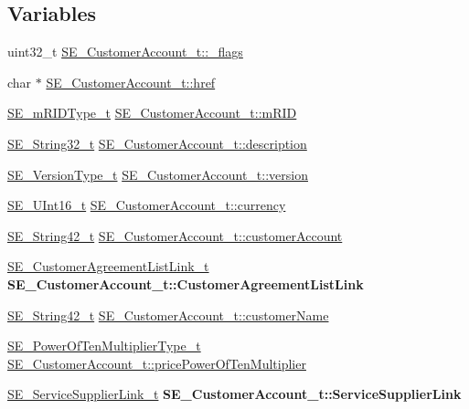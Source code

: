 \subsection*{Variables}
\begin{DoxyCompactItemize}
\item 
uint32\+\_\+t \hyperlink{group__CustomerAccount_ga67357b4c7d720b91d84e22a2d383b840}{S\+E\+\_\+\+Customer\+Account\+\_\+t\+::\+\_\+flags}
\item 
char $\ast$ \hyperlink{group__CustomerAccount_gab1bd1ed1eeba3c50a86025c8eae89d7c}{S\+E\+\_\+\+Customer\+Account\+\_\+t\+::href}
\item 
\hyperlink{group__mRIDType_gac74622112f3a388a2851b2289963ba5e}{S\+E\+\_\+m\+R\+I\+D\+Type\+\_\+t} \hyperlink{group__CustomerAccount_ga082521d42ddb1a5f0726f2581b0dd79c}{S\+E\+\_\+\+Customer\+Account\+\_\+t\+::m\+R\+ID}
\item 
\hyperlink{group__String32_gac9f59b06b168b4d2e0d45ed41699af42}{S\+E\+\_\+\+String32\+\_\+t} \hyperlink{group__CustomerAccount_ga78f10a26490a0a66e2754e50f1c82d03}{S\+E\+\_\+\+Customer\+Account\+\_\+t\+::description}
\item 
\hyperlink{group__VersionType_ga4b8d27838226948397ed99f67d46e2ae}{S\+E\+\_\+\+Version\+Type\+\_\+t} \hyperlink{group__CustomerAccount_ga8b1e7a90151362aeb3a332887fa74081}{S\+E\+\_\+\+Customer\+Account\+\_\+t\+::version}
\item 
\hyperlink{group__UInt16_gac68d541f189538bfd30cfaa712d20d29}{S\+E\+\_\+\+U\+Int16\+\_\+t} \hyperlink{group__CustomerAccount_ga57aff523528ef264d27004ae1bff0377}{S\+E\+\_\+\+Customer\+Account\+\_\+t\+::currency}
\item 
\hyperlink{group__String42_gad5a294b994fa3a024ca6d747f784f0d9}{S\+E\+\_\+\+String42\+\_\+t} \hyperlink{group__CustomerAccount_gade9da1bd7f943a99c644c927b0a25318}{S\+E\+\_\+\+Customer\+Account\+\_\+t\+::customer\+Account}
\item 
\mbox{\label{group__CustomerAccount_ga0ef52c460aa4eefcaecec6afd01f4a78}} 
\hyperlink{structSE__CustomerAgreementListLink__t}{S\+E\+\_\+\+Customer\+Agreement\+List\+Link\+\_\+t} {\bfseries S\+E\+\_\+\+Customer\+Account\+\_\+t\+::\+Customer\+Agreement\+List\+Link}
\item 
\hyperlink{group__String42_gad5a294b994fa3a024ca6d747f784f0d9}{S\+E\+\_\+\+String42\+\_\+t} \hyperlink{group__CustomerAccount_gaa057fa102ef3d9ab9c241455867a37ae}{S\+E\+\_\+\+Customer\+Account\+\_\+t\+::customer\+Name}
\item 
\hyperlink{group__PowerOfTenMultiplierType_gaf0317b781dc8dbb9cb6ac4e44a14fdef}{S\+E\+\_\+\+Power\+Of\+Ten\+Multiplier\+Type\+\_\+t} \hyperlink{group__CustomerAccount_gae70b8191d202d0a24ee6f90f8cbe9614}{S\+E\+\_\+\+Customer\+Account\+\_\+t\+::price\+Power\+Of\+Ten\+Multiplier}
\item 
\mbox{\label{group__CustomerAccount_ga5df754b3217fb49ca092e5566b5067d9}} 
\hyperlink{structSE__ServiceSupplierLink__t}{S\+E\+\_\+\+Service\+Supplier\+Link\+\_\+t} {\bfseries S\+E\+\_\+\+Customer\+Account\+\_\+t\+::\+Service\+Supplier\+Link}
\end{DoxyCompactItemize}


